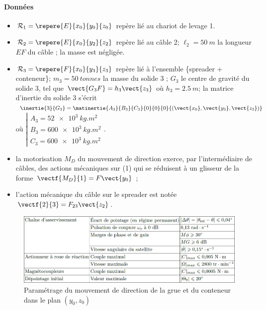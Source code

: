 \documentclass[10pt,fleqn]{article} %
\begin{document}
\paragraph*{Données}
\begin{itemize}
\item $\mathcal{R}_1=\repere{E}{x_0}{y_0}{z_0}$  repère lié au chariot de levage 1.
\item $\mathcal{R}_2=\repere{E}{x_0}{y_2}{z_2}$  repère lié au câble 2; $\ell_2 = \SI{50}{m}$ la longueur $EF$
du câble ; la masse est négligée.
\item $\mathcal{R}_3=\repere{F}{x_0}{y_3}{z_3}$  repère lié à l’ensemble \{spreader + conteneur\};
$m_3 = \SI{50}{tonnes}$ la masse du solide 3 ; $G_3$ le centre de gravité du
solide 3, tel que $\vect{G_3F}=h_3\vect{z_3}$ où $h_3 = \SI{2,5}{m}$; la matrice d’inertie du solide 3 s’écrit
$\inertie{3}{G_3}=\matinertie{A_3}{B_3}{C_3}{0}{0}{0}{\left(\vect{x_0},\vect{y_3},\vect{z_3} \right)}$ où $\left| \begin{array}{l} A_3 = \SI{52e3}{kg.m^2} \\ B_3 = \SI{600e3}{kg.m^2} \\ C_3 = \SI{600e3}{kg.m^2} \end{array}\right.$. 
\item la motorisation $M_D$ du mouvement de direction exerce, par l’intermédiaire de câbles, des actions mécaniques sur (1) qui se réduisent
à un glisseur de la forme $\vectf{M_D}{1} =F \vect{y_0}$ ;
\item l’action mécanique du câble sur le spreader est notée $\vectf{2}{3} =F_{23} \vect{z_2}$.
\end{itemize}



\begin{figure}[H]
\centering
\includegraphics[width=.4\linewidth]{images/fig_09}
\caption{Paramétrage du mouvement de direction de la grue et du conteneur dans le plan $(y_0, z_0)$ \label{fig_09}}
\end{figure}
\end{document}

